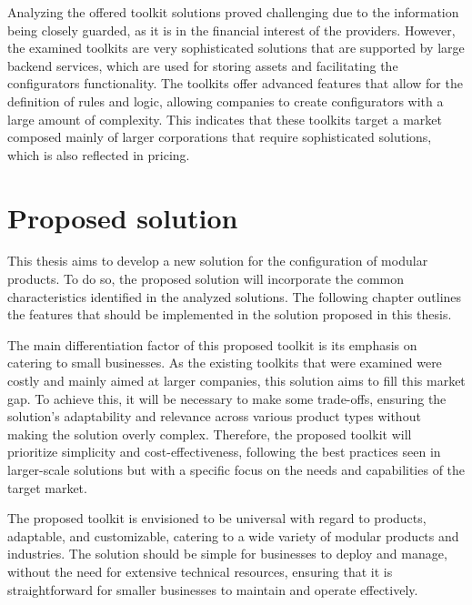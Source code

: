 Analyzing the offered toolkit solutions proved challenging due to the information being closely guarded, as it is in the financial interest of the providers. However, the examined toolkits are very sophisticated solutions that are supported by large backend services, which are used for storing assets and facilitating the configurators functionality. The toolkits offer advanced features that allow for the definition of rules and logic, allowing companies to create configurators with a large amount of complexity. This indicates that these toolkits target a market composed mainly of larger corporations that require sophisticated solutions, which is also reflected in pricing.

\section{Proposed solution}

This thesis aims to develop a new solution for the configuration of modular products. To do so, the proposed solution will incorporate the common characteristics identified in the analyzed solutions. The following chapter outlines the features that should be implemented in the solution proposed in this thesis.

The main differentiation factor of this proposed toolkit is its emphasis on catering to small businesses. As the existing toolkits that were examined were costly and mainly aimed at larger companies, this solution aims to fill this market gap. To achieve this, it will be necessary to make some trade-offs, ensuring the solution's adaptability and relevance across various product types without making the solution overly complex. Therefore, the proposed toolkit will prioritize simplicity and cost-effectiveness, following the best practices seen in larger-scale solutions but with a specific focus on the needs and capabilities of the target market.
 
The proposed toolkit is envisioned to be universal with regard to products, adaptable, and customizable, catering to a wide variety of modular products and industries. The solution should be simple for businesses to deploy and manage, without the need for extensive technical resources, ensuring that it is straightforward for smaller businesses to maintain and operate effectively.

